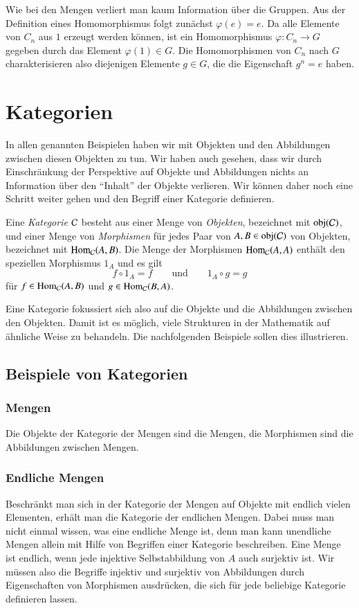 Wie bei den Mengen verliert man kaum Information über die Gruppen.
Aus der Definition eines Homomorphismus folgt zunächst $\varphi(e)=e$.
Da alle Elemente von $C_n$ aus $1$ erzeugt werden können, ist 
ein Homomorphismus $\varphi\colon C_n\to G$ gegeben durch das 
Element $\varphi(1)\in G$.
Die Homomorphismen von $C_n$ nach $G$ charakterisieren also diejenigen
Elemente $g\in G$, die die Eigenschaft $g^n=e$ haben.

\section{Kategorien}
In allen genannten Beispielen haben wir mit Objekten und den Abbildungen
zwischen diesen Objekten zu tun.
Wir haben auch gesehen, dass wir durch Einschränkung der Perspektive auf
Objekte und Abbildungen nichts an Information über den ``Inhalt'' der
Objekte verlieren.
Wir können daher noch eine Schritt weiter gehen und den Begriff einer
Kategorie definieren.

\begin{definition}
Eine {\em Kategorie} $\cal C$ besteht aus einer Menge von {\em Objekten},
bezeichnet mit $\operatorname{obj}(\cal C)$, und einer Menge von
{\em Morphismen} für jedes Paar von $A,B\in\operatorname{obj}(\cal C)$ von
Objekten, bezeichnet mit
$\operatorname{Hom}_{\cal C}(A,B)$.
Die Menge der Morphismen $\operatorname{Hom}_{\cal C}(A,A)$
enthält den speziellen Morphismus $1_A$ und es gilt
\[
f\circ 1_A = f
\qquad\text{und}\qquad
1_A\circ g = g
\]
für
$f\in\operatorname{Hom}_{\cal C}(A,B)$
und
$g\in\operatorname{Hom}_{\cal C}(B,A)$.
\end{definition}

Eine Kategorie fokussiert sich also auf die Objekte und die Abbildungen 
zwischen den Objekten.
Damit ist es möglich, viele Strukturen in der Mathematik auf ähnliche
Weise zu behandeln.
Die nachfolgenden Beispiele sollen dies illustrieren.

\subsection{Beispiele von Kategorien}
\subsubsection{Mengen}
Die Objekte der Kategorie der Mengen sind die Mengen, die Morphismen
sind die Abbildungen zwischen Mengen.

\subsubsection{Endliche Mengen}
Beschränkt man sich in der Kategorie der Mengen auf Objekte mit
endlich vielen Elementen, erhält man die Kategorie der endlichen Mengen.
Dabei muss man nicht einmal wissen, was eine endliche Menge ist,
denn man kann unendliche Mengen allein mit Hilfe von Begriffen einer
Kategorie beschreiben.
Eine Menge ist endlich, wenn jede injektive Selbstabbildung von $A$ auch
surjektiv ist.
Wir müssen also die Begriffe injektiv und surjektiv von Abbildungen
durch Eigenschaften von Morphismen ausdrücken, die sich für jede beliebige
Kategorie definieren lassen.

